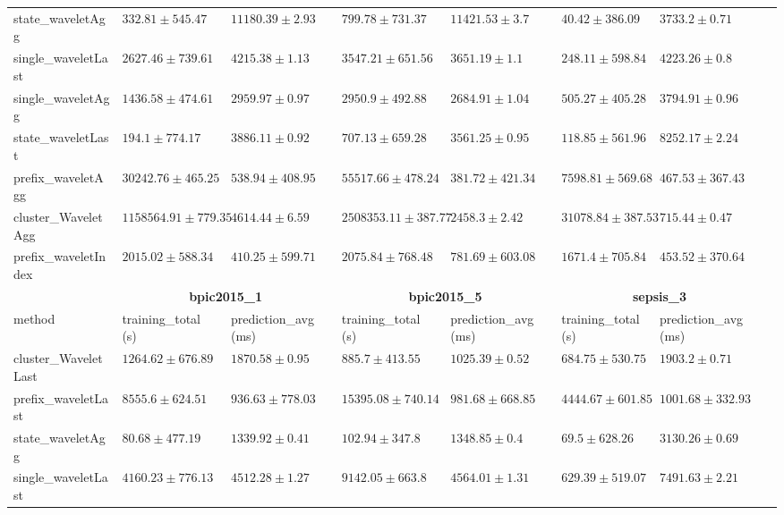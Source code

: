 \documentclass[twoside,11pt]{Latex/Classes/PhDthesisPSnPDF}
\begin{document}
\begin{table}[h]
{\begin{tabular}{llllllll}
				state\_waveletAgg & $332.81 \pm 545.47$ & $11180.39 \pm 2.93$ & $799.78 \pm 731.37$ & $11421.53 \pm 3.7$ & $\mathbf{40.42 \pm 386.09}$ & $3733.2 \pm 0.71$ \\ 
				single\_waveletLast & $2627.46 \pm 739.61$ & $4215.38 \pm 1.13$ & $3547.21 \pm 651.56$ & $3651.19 \pm 1.1$ & $248.11 \pm 598.84$ & $4223.26 \pm 0.8$ \\ 
				single\_waveletAgg & $1436.58 \pm 474.61$ & $2959.97 \pm 0.97$ & $2950.9 \pm 492.88$ & $2684.91 \pm 1.04$ & $505.27 \pm 405.28$ & $3794.91 \pm 0.96$ \\ 
				state\_waveletLast & $\mathbf{194.1 \pm 774.17}$ & $3886.11 \pm 0.92$ & $\mathbf{707.13 \pm 659.28}$ & $3561.25 \pm 0.95$ & $118.85 \pm 561.96$ & $8252.17 \pm 2.24$ \\ 
				prefix\_waveletAgg & $30242.76 \pm 465.25$ & $538.94 \pm 408.95$ & $55517.66 \pm 478.24$ & $\mathbf{381.72 \pm 421.34}$ & $7598.81 \pm 569.68$ & $467.53 \pm 367.43$ \\ 
				cluster\_WaveletAgg & $1158564.91 \pm 779.35$ & $4614.44 \pm 6.59$ & $2508353.11 \pm 387.77$ & $2458.3 \pm 2.42$ & $31078.84 \pm 387.53$ & $715.44 \pm 0.47$ \\ 
				prefix\_waveletIndex & $2015.02 \pm 588.34$ & $\mathbf{410.25 \pm 599.71}$ & $2075.84 \pm 768.48$ & $781.69 \pm 603.08$ & $1671.4 \pm 705.84$ & $\mathbf{453.52 \pm 370.64}$ \\ 
				\bottomrule
				\toprule
				& \multicolumn{2}{c}{{\bfseries bpic2015\_1}} & \multicolumn{2}{c}{{\bfseries bpic2015\_5}} & \multicolumn{2}{c}{{\bfseries sepsis\_3}} \\ \cmidrule(lr){2-3} \cmidrule(lr){4-5} \cmidrule(lr){6-7}
				method  & training\_total (s) & prediction\_avg (ms) & training\_total (s) & prediction\_avg (ms) & training\_total (s) & prediction\_avg (ms) \\ \midrule
				cluster\_WaveletLast & $1264.62 \pm 676.89$ & $1870.58 \pm 0.95$ & $885.7 \pm 413.55$ & $1025.39 \pm 0.52$ & $684.75 \pm 530.75$ & $1903.2 \pm 0.71$ \\ 
				prefix\_waveletLast & $8555.6 \pm 624.51$ & $936.63 \pm 778.03$ & $15395.08 \pm 740.14$ & $981.68 \pm 668.85$ & $4444.67 \pm 601.85$ & $1001.68 \pm 332.93$ \\ 
				state\_waveletAgg & $\mathbf{80.68 \pm 477.19}$ & $1339.92 \pm 0.41$ & $\mathbf{102.94 \pm 347.8}$ & $1348.85 \pm 0.4$ & $\mathbf{69.5 \pm 628.26}$ & $3130.26 \pm 0.69$ \\ 
				single\_waveletLast & $4160.23 \pm 776.13$ & $4512.28 \pm 1.27$ & $9142.05 \pm 663.8$ & $4564.01 \pm 1.31$ & $629.39 \pm 519.07$ & $7491.63 \pm 2.21$ \\ 

\end{tabular}}
\end{table}
\end{document}
